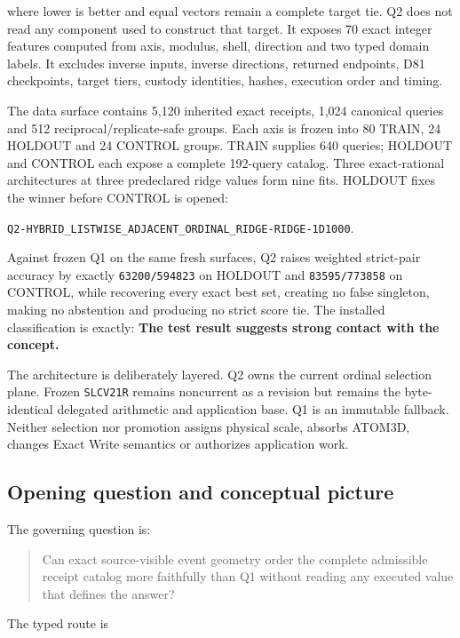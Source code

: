 where lower is better and equal vectors remain a complete target tie. Q2
does not read any component used to construct that target. It exposes 70
exact integer features computed from axis, modulus, shell, direction and
two typed domain labels. It excludes inverse inputs, inverse directions,
returned endpoints, D81 checkpoints, target tiers, custody identities,
hashes, execution order and timing.

The data surface contains 5,120 inherited exact receipts, 1,024
canonical queries and 512 reciprocal/replicate-safe groups. Each axis is
frozen into 80 TRAIN, 24 HOLDOUT and 24 CONTROL groups. TRAIN supplies
640 queries; HOLDOUT and CONTROL each expose a complete 192-query
catalog. Three exact-rational architectures at three predeclared ridge
values form nine fits. HOLDOUT fixes the winner before CONTROL is
opened:

\nolinkurl{Q2-HYBRID_LISTWISE_ADJACENT_ORDINAL_RIDGE-RIDGE-1D1000}.

Against frozen Q1 on the same fresh surfaces, Q2 raises weighted
strict-pair accuracy by exactly \texttt{63200/594823} on HOLDOUT and
\texttt{83595/773858} on CONTROL, while recovering every exact best set,
creating no false singleton, making no abstention and producing no
strict score tie. The installed classification is exactly: \textbf{The
test result suggests strong contact with the concept.}

The architecture is deliberately layered. Q2 owns the current ordinal
selection plane. Frozen \texttt{SLCV21R} remains noncurrent as a
revision but remains the byte-identical delegated arithmetic and
application base. Q1 is an immutable fallback. Neither selection nor
promotion assigns physical scale, absorbs ATOM3D, changes Exact Write
semantics or authorizes application work.

\subsection{Opening question and conceptual
picture}\label{viii-ch07-opening-question-and-conceptual-picture}

The governing question is:

\begin{quote}
Can exact source-visible event geometry order the complete admissible
receipt catalog more faithfully than Q1 without reading any executed
value that defines the answer?
\end{quote}

The typed route is

